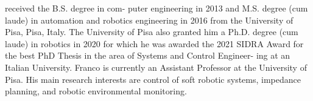 received the B.S. degree in com-
puter engineering in 2013 and M.S. degree (cum
laude) in automation and robotics engineering in
2016 from the University of Pisa, Pisa, Italy. The
University of Pisa also granted him a Ph.D. degree
(cum laude) in robotics in 2020 for which he was
awarded the 2021 SIDRA Award for the best PhD
Thesis in the area of Systems and Control Engineer-
ing at an Italian University. Franco is currently an
Assistant Professor at the University of Pisa. His
main research interests are control of soft robotic
systems, impedance planning, and robotic environmental monitoring.